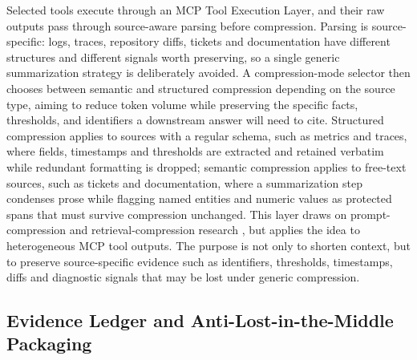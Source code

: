 Selected tools execute through an MCP Tool Execution Layer, and their raw outputs pass through source-aware parsing before compression. Parsing is source-specific: logs, traces, repository diffs, tickets and documentation have different structures and different signals worth preserving, so a single generic summarization strategy is deliberately avoided. A compression-mode selector then chooses between semantic and structured compression depending on the source type, aiming to reduce token volume while preserving the specific facts, thresholds, and identifiers a downstream answer will need to cite. Structured compression applies to sources with a regular schema, such as metrics and traces, where fields, timestamps and thresholds are extracted and retained verbatim while redundant formatting is dropped; semantic compression applies to free-text sources, such as tickets and documentation, where a summarization step condenses prose while flagging named entities and numeric values as protected spans that must survive compression unchanged. This layer draws on prompt-compression and retrieval-compression research \cite{Jiang2023, Jiang2024, Xu2024}, but applies the idea to heterogeneous MCP tool outputs. The purpose is not only to shorten context, but to preserve source-specific evidence such as identifiers, thresholds, timestamps, diffs and diagnostic signals that may be lost under generic compression.

\subsection{Evidence Ledger and Anti-Lost-in-the-Middle Packaging}


